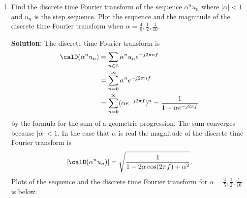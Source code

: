 \documentclass[11pt,a4paper]{book}
\theoremstyle{plain}
\numberwithin{equation}{section}
\newcommand{\ints}{{\mathbb Z}}
\newcommand{\abs}[1]{\left\vert #1 \right\vert}
\newenvironment{solution}{\begin{footnotesize}\textbf{Solution:}}{\end{footnotesize}}
\newenvironment{excersizelist}{%
  \renewcommand*{\theenumi}{\thechapter.\arabic{enumi}}%
  \newcommand\itemadvanced{\stepcounter{enumi}\item[$\ast$\, \theenumi.]}
  \begin{enumerate}
}{%
  \end{enumerate}
}
\begin{document}
\begin{excersizelist}
\begin{solution}
The sequence is bounded below any number greater than 1 because $\abs{\cos(x)} \leq 1$ (precisely 1 would also work in this case).  The sequence is not periodic.  To see this, suppose the sequence has period $T \in \ints$ so that $\cos(n) = \cos(n + kT)$ for all $k \in \ints$.  The period of $\cos(x)$ is $2\pi$ and $\cos(x) = \cos(y)$ only if $x = y + 2\pi \ell$ for some $\ell \in \ints$.  Thus, we must have $n = n + kT + 2\pi \ell$ for some $\ell$ and each $k$.  But, now $\pi = \frac{kT}{2\ell}$ which violates the fact that $\pi$ is irrational.  Thus, no such period $T$ exists.

\end{solution}

\item Find the discrete time Fourier transform of the sequence $\alpha^n u_n$ where $\abs{\alpha} < 1$ and $u_n$ is the step sequence.  Plot the sequence and the magnitude of the discrete time Fourier transform when $\alpha = \tfrac{4}{5}, \tfrac{1}{2}, \tfrac{1}{10}$.
\begin{solution}
The discrete time Fourier transform is
\begin{align*}
\calD( \alpha^n u_n ) &= \sum_{n \in \ints} \alpha^n u_n e^{-j 2\pi n f} \\
&= \sum_{n = 0}^\infty \alpha^n e^{-j 2\pi n f} \\
&= \sum_{n = 0}^\infty (\alpha e^{-j 2\pi f})^n = \frac{1}{1 -  \alpha  e^{-j 2\pi f}}
\end{align*}
by the formula for the sum of a geometric progression.  The sum converges because $\abs{\alpha} < 1$.  In the case that $\alpha$ is real the magnitude of the discrete time Fourier transform is
\[
\abs{\calD( \alpha^n u_n )} = \sqrt{\frac{1}{1 - 2\alpha\cos(2\pi f) + \alpha^2}}.
\]
Plots of the sequence and the discrete time Fourier transform for $\alpha = \tfrac{4}{5}, \tfrac{1}{2}, \tfrac{1}{10}$ is below.


\end{solution}
\end{excersizelist}
\end{document}
